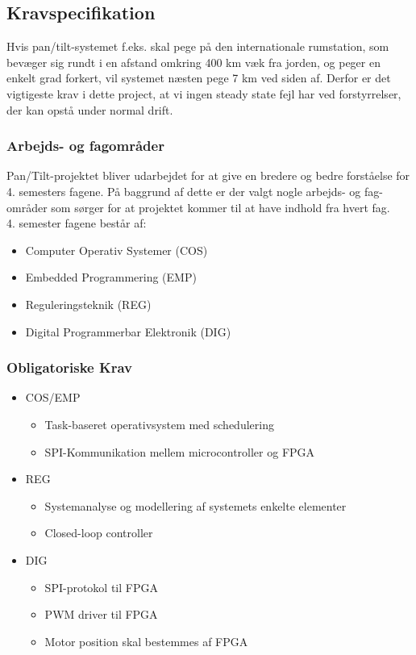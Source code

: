 \subsection{Kravspecifikation}

Hvis pan/tilt-systemet f.eks. skal pege på den internationale rumstation, som bevæger sig rundt i en afstand omkring 400 km væk fra jorden, og peger en enkelt grad forkert, vil systemet næsten pege 7 km ved siden af. Derfor er det vigtigeste krav i dette project, at vi ingen steady state fejl har ved forstyrrelser, der kan opstå under normal drift.

\subsubsection{Arbejds- og fagområder}
Pan/Tilt-projektet bliver udarbejdet for at give en bredere og bedre forståelse for 4. semesters fagene. På baggrund af dette er der valgt nogle arbejds- og fag-områder som sørger for at projektet kommer til at have indhold fra hvert fag.\\
4. semester fagene består af:
\begin{itemize}[noitemsep]
	\item Computer Operativ Systemer (COS)
	\item Embedded Programmering (EMP)
	\item Reguleringsteknik (REG)
	\item Digital Programmerbar Elektronik (DIG)
\end{itemize}

\subsubsection{Obligatoriske Krav}

\begin{itemize}[noitemsep]
	\item COS/EMP
	\begin{itemize}[noitemsep]
		\item Task-baseret operativsystem med schedulering
		\item SPI-Kommunikation mellem microcontroller og FPGA
	\end{itemize}
	\item REG
	\begin{itemize}[noitemsep]
		\item Systemanalyse og modellering af systemets enkelte elementer
		\item Closed-loop controller
	\end{itemize}
	\item DIG
	\begin{itemize}[noitemsep]
		\item SPI-protokol til FPGA
		\item PWM driver til FPGA
		\item Motor position skal bestemmes af FPGA
	\end{itemize}
\end{itemize}

